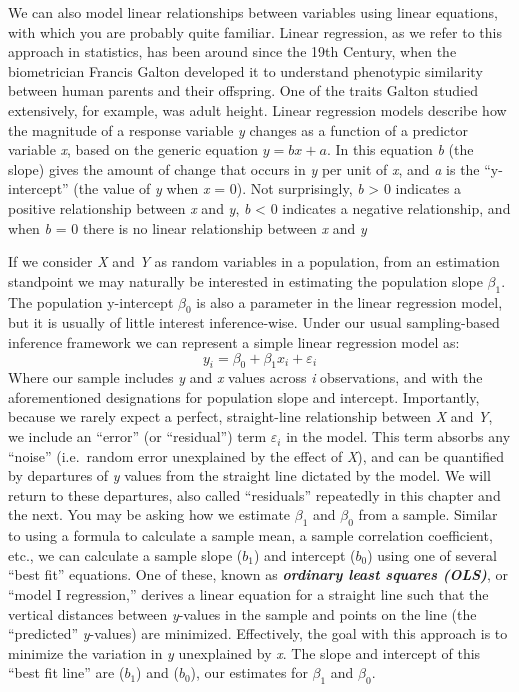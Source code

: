 \documentclass[
]{book}
\begin{document}
We can also model linear relationships between variables using linear equations, with which you are probably quite familiar. Linear regression, as we refer to this approach in statistics, has been around since the 19th Century, when the biometrician Francis Galton developed it to understand phenotypic similarity between human parents and their offspring. One of the traits Galton studied extensively, for example, was adult height. Linear regression models describe how the magnitude of a response variable \emph{y} changes as a function of a predictor variable \emph{x}, based on the generic equation \(y=bx+a\). In this equation \emph{b} (the slope) gives the amount of change that occurs in \emph{y} per unit of \emph{x}, and \emph{a} is the ``y-intercept'' (the value of \emph{y} when \emph{x} = 0). Not surprisingly, \emph{b} \textgreater{} 0 indicates a positive relationship between \emph{x} and \emph{y}, \emph{b} \textless{} 0 indicates a negative relationship, and when \emph{b} = 0 there is no linear relationship between \emph{x} and \emph{y}

If we consider \emph{X} and \emph{Y} as random variables in a population, from an estimation standpoint we may naturally be interested in estimating the population slope \(\beta_1\). The population y-intercept \(\beta_0\) is also a parameter in the linear regression model, but it is usually of little interest inference-wise. Under our usual sampling-based inference framework we can represent a simple linear regression model as:
\[y_i=\beta_0+\beta_1x_i+\varepsilon_i\]
Where our sample includes \emph{y} and \emph{x} values across \emph{i} observations, and with the aforementioned designations for population slope and intercept. Importantly, because we rarely expect a perfect, straight-line relationship between \emph{X} and \emph{Y}, we include an ``error'' (or ``residual'') term \(\varepsilon_i\) in the model. This term absorbs any ``noise'' (i.e.~random error unexplained by the effect of \emph{X}), and can be quantified by departures of \emph{y} values from the straight line dictated by the model. We will return to these departures, also called ``residuals'' repeatedly in this chapter and the next. You may be asking how we estimate \(\beta_1\) and \(\beta_0\) from a sample. Similar to using a formula to calculate a sample mean, a sample correlation coefficient, etc., we can calculate a sample slope (\(b_1\)) and intercept (\(b_0\)) using one of several ``best fit'' equations. One of these, known as \textbf{\emph{ordinary least squares (OLS)}}, or ``model I regression,'' derives a linear equation for a straight line such that the vertical distances between \emph{y}-values in the sample and points on the line (the ``predicted'' \emph{y}-values) are minimized. Effectively, the goal with this approach is to minimize the variation in \emph{y} unexplained by \emph{x}. The slope and intercept of this ``best fit line'' are (\(b_1\)) and (\(b_0\)), our estimates for \(\beta_1\) and \(\beta_0\).
\end{document}
